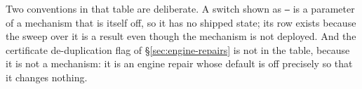 Two conventions in that table are deliberate. A switch shown as \texttt{---} is a
parameter of a mechanism that is itself off, so it has no shipped state; its row
exists because the sweep over it is a result even though the mechanism is not
deployed. And the certificate de-duplication flag of
\S\ref{sec:engine-repairs} is not in the table, because it is not a mechanism: it
is an engine repair whose default is off precisely so that it changes nothing.
